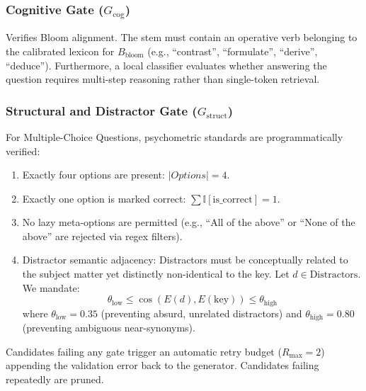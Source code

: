 \documentclass[conference]{IEEEtran}
\begin{document}
\subsubsection{Cognitive Gate ($G_{\text{cog}}$)}
Verifies Bloom alignment. The stem must contain an operative verb belonging to the calibrated lexicon for $B_{\text{bloom}}$ (e.g., ``contrast'', ``formulate'', ``derive'', ``deduce''). Furthermore, a local classifier evaluates whether answering the question requires multi-step reasoning rather than single-token retrieval.

\subsubsection{Structural and Distractor Gate ($G_{\text{struct}}$)}
For Multiple-Choice Questions, psychometric standards are programmatically verified:
\begin{enumerate}
    \item Exactly four options are present: $|Options| = 4$.
    \item Exactly one option is marked correct: $\sum \mathbb{I}[\text{is\_correct}] = 1$.
    \item No lazy meta-options are permitted (e.g., ``All of the above'' or ``None of the above'' are rejected via regex filters).
    \item Distractor semantic adjacency: Distractors must be conceptually related to the subject matter yet distinctly non-identical to the key. Let $d \in \text{Distractors}$. We mandate:
    \begin{equation}
    \theta_{\text{low}} \le \cos(E(d), E(\text{key})) \le \theta_{\text{high}}
    \end{equation}
    where $\theta_{\text{low}} = 0.35$ (preventing absurd, unrelated distractors) and $\theta_{\text{high}} = 0.80$ (preventing ambiguous near-synonyms).
\end{enumerate}

Candidates failing any gate trigger an automatic retry budget ($R_{\text{max}} = 2$) appending the validation error back to the generator. Candidates failing repeatedly are pruned.
\end{document}
